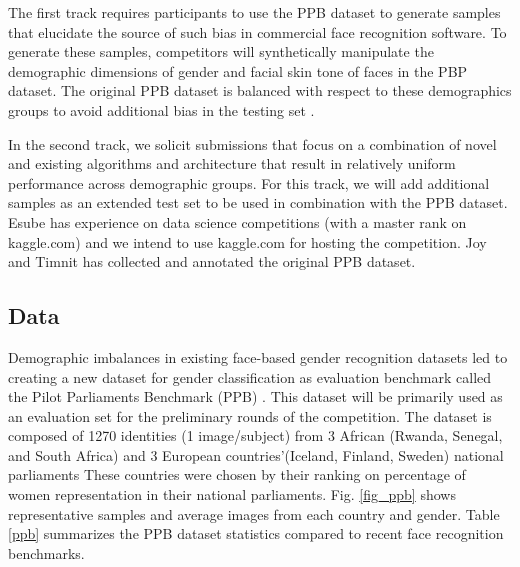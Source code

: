 \documentclass[11pt, oneside]{article}
\makeatletter
\let\@internalcite\cite
\def\cite{\def\citeauthoryear##1##2{##1, ##2}\@internalcite}
\makeatother
\begin{document}
The first track requires participants to use the PPB dataset to generate 
samples that elucidate the source of such bias in commercial face recognition 
software.  To generate these samples, competitors will synthetically manipulate 
the demographic dimensions of gender and facial skin tone of faces in the PBP 
dataset. The original PPB dataset is balanced with respect to these 
demographics groups to avoid additional bias in the testing set 
\cite{buolamwini2018gender}.

In the second track, we solicit submissions that focus on a combination of 
novel and existing algorithms and architecture that result in relatively 
uniform performance across demographic groups. For this track, we will add 
additional samples as an extended test set to be used in combination with the 
PPB dataset. Esube has experience on data science competitions (with a master 
rank on kaggle.com) and we intend to use kaggle.com for hosting the 
competition. Joy and Timnit has collected and annotated the original PPB 
dataset.

\subsection{Data}

Demographic imbalances in existing face-based gender recognition datasets led 
to creating a new dataset for gender classification as evaluation benchmark 
called the Pilot Parliaments Benchmark (PPB) \cite{buolamwini2018gender}. This 
dataset will be primarily used as an evaluation set for the preliminary rounds 
of the competition. The dataset is composed of 1270 identities (1 
image/subject) from 3 African (Rwanda, Senegal, and South Africa) and 3 
European countries'(Iceland, Finland, Sweden) national parliaments These 
countries were chosen by their ranking on percentage of women representation in 
their national parliaments. Fig. \ref{fig_ppb} shows representative samples and 
average images from each country and gender. Table \ref{ppb} summarizes the PPB 
dataset statistics compared to recent face recognition benchmarks.
\end{document}
